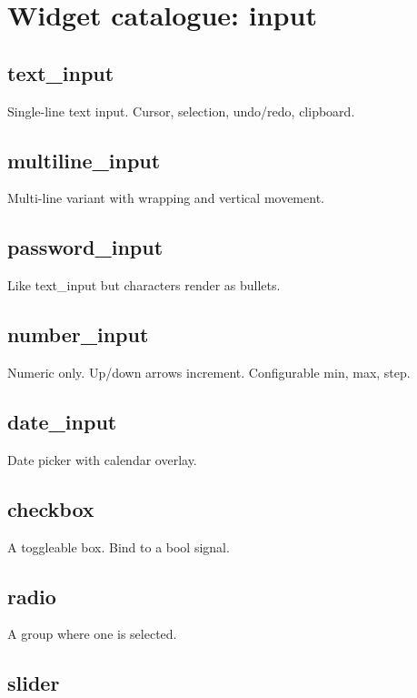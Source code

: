 \chapter{Widget catalogue: input}
\label{ch:catalogue_input}

\section{text\_input}

Single-line text input. Cursor, selection, undo/redo,
clipboard.

\section{multiline\_input}

Multi-line variant with wrapping and vertical movement.

\section{password\_input}

Like text\_input but characters render as bullets.

\section{number\_input}

Numeric only. Up/down arrows increment. Configurable
min, max, step.

\section{date\_input}

Date picker with calendar overlay.

\section{checkbox}

A toggleable box. Bind to a bool signal.

\section{radio}

A group where one is selected.

\section{slider}

